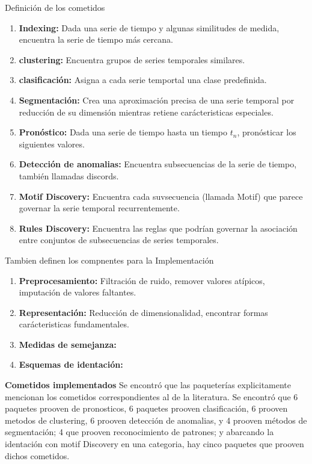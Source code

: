 \documentclass[a4paper, 11pt]{article}
\begin{document}
Definición de los cometidos
\begin{enumerate}
    \item \textbf{Indexing: } Dada una serie de tiempo y algunas similitudes de medida, encuentra la serie de tiempo más cercana.
    \item \textbf{clustering: } Encuentra grupos de series temporales similares.
    \item \textbf{clasificación: } Asigna a cada serie temportal una clase predefinida.
    \item \textbf{Segmentación: } Crea una aproximación precisa de una serie temporal por reducción de su dimensión mientras retiene carácteristicas especiales.
    \item \textbf{Pronóstico: } Dada una serie de tiempo hasta un tiempo $t_n$, pronósticar los siguientes valores.
    \item \textbf{Detección de anomalias: } Encuentra subsecuencias de la serie de tiempo, también llamadas discords.
    \item \textbf{Motif Discovery: } Encuentra cada suvsecuencia (llamada Motif) que parece governar la serie temporal recurrentemente.
    \item \textbf{Rules Discovery: } Encuentra las reglas que podrían governar la asociación entre conjuntos de subsecuencias de series temporales.
\end{enumerate}

Tambien definen los compnentes para la Implementación
\begin{enumerate}
    \item \textbf{Preprocesamiento: } Filtración de ruido, remover valores atípicos, imputación de valores faltantes.
    \item \textbf{Representación: } Reducción de dimensionalidad, encontrar formas carácteristicas fundamentales.
    \item \textbf{Medidas de semejanza:}
    \item \textbf{Esquemas de identación:}
\end{enumerate}

\textbf{Cometidos implementados} Se encontró que las paqueterías explicitamente mencionan los cometidos correspondientes al de la literatura. Se encontró que 6 paquetes prooven de pronosticos, 6 paquetes prooven clasificación, 6 prooven metodos de clustering, 6 prooven detección de anomalias, y 4 prooven métodos de segmentación; 4 que prooven reconocimiento de patrones; y abarcando la identación con motif Discovery en una categoria, hay cinco paquetes que prooven dichos cometidos.
\end{document}
